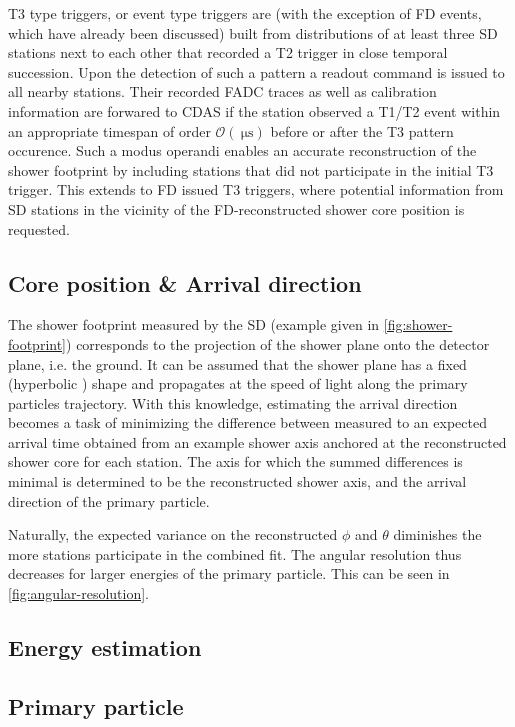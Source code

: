 T3 type triggers, or event type triggers are (with the exception of FD events, which have already been discussed) built from distributions of at least three SD 
stations next to each other that recorded a T2 trigger in close temporal succession. Upon the detection of such a pattern a readout command is issued to all nearby 
stations. Their recorded FADC traces as well as calibration information are forwared to CDAS if the station observed a T1/T2 event within an appropriate timespan 
of order $\mathcal{O}(\SI{}{\micro\second})$ before or after the T3 pattern occurence. Such a modus operandi enables an accurate reconstruction of the shower 
footprint by including stations that did not participate in the initial T3 trigger. This extends to FD issued T3 triggers, where potential information from SD 
stations in the vicinity of the FD-reconstructed shower core position is requested.

\subsection{Core position \& Arrival direction}
\label{ssec:arrival-direction}

The shower footprint measured by the SD (example given in \autoref{fig:shower-footprint}) corresponds to the projection of the shower plane onto the detector 
plane, i.e. the ground. It can be assumed that the shower plane has a fixed (hyperbolic \cite{bonifazi2005angular}) shape and propagates at the speed of light 
along the primary particles trajectory. With this knowledge, estimating the arrival direction becomes a task of minimizing the difference between measured to an
expected arrival time obtained from an example shower axis anchored at the reconstructed shower core for each station. The axis for which the summed differences is 
minimal is determined to be the reconstructed shower axis, and the arrival direction of the primary particle.

Naturally, the expected variance on the reconstructed $\phi$ and $\theta$ diminishes the more stations participate in the combined fit. The angular resolution thus
decreases for larger energies of the primary particle. This can be seen in \autoref{fig:angular-resolution}.

\subsection{Energy estimation}
\label{ssec:energy-estimation}



\subsection{Primary particle}
\label{ssec:primary-particle}

